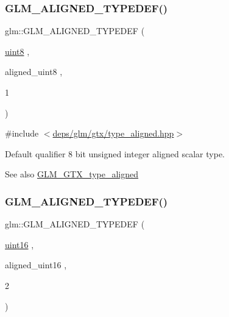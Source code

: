 \subsubsection{\texorpdfstring{G\+L\+M\+\_\+\+A\+L\+I\+G\+N\+E\+D\+\_\+\+T\+Y\+P\+E\+D\+E\+F()}{GLM\_ALIGNED\_TYPEDEF()}\hspace{0.1cm}{\footnotesize\ttfamily [105/209]}}
{\footnotesize\ttfamily glm\+::\+G\+L\+M\+\_\+\+A\+L\+I\+G\+N\+E\+D\+\_\+\+T\+Y\+P\+E\+D\+EF (\begin{DoxyParamCaption}\item[{\hyperlink{group__gtc__type__precision_ga1a7dcd8aac97cc8020817c94049deff2}{uint8}}]{,  }\item[{aligned\+\_\+uint8}]{,  }\item[{1}]{ }\end{DoxyParamCaption})}



{\ttfamily \#include $<$\hyperlink{gtx_2type__aligned_8hpp}{deps/glm/gtx/type\+\_\+aligned.\+hpp}$>$}

Default qualifier 8 bit unsigned integer aligned scalar type. \begin{DoxySeeAlso}{See also}
\hyperlink{group__gtx__type__aligned}{G\+L\+M\+\_\+\+G\+T\+X\+\_\+type\+\_\+aligned} 
\end{DoxySeeAlso}
\mbox{\label{group__gtx__type__aligned_ga06c296c9e398b294c8c9dd2a7693dcbb}} 
\subsubsection{\texorpdfstring{G\+L\+M\+\_\+\+A\+L\+I\+G\+N\+E\+D\+\_\+\+T\+Y\+P\+E\+D\+E\+F()}{GLM\_ALIGNED\_TYPEDEF()}\hspace{0.1cm}{\footnotesize\ttfamily [106/209]}}
{\footnotesize\ttfamily glm\+::\+G\+L\+M\+\_\+\+A\+L\+I\+G\+N\+E\+D\+\_\+\+T\+Y\+P\+E\+D\+EF (\begin{DoxyParamCaption}\item[{\hyperlink{group__gtc__type__precision_gad8c2939e1fdd8e5828b31d95c52255d5}{uint16}}]{,  }\item[{aligned\+\_\+uint16}]{,  }\item[{2}]{ }\end{DoxyParamCaption})}



